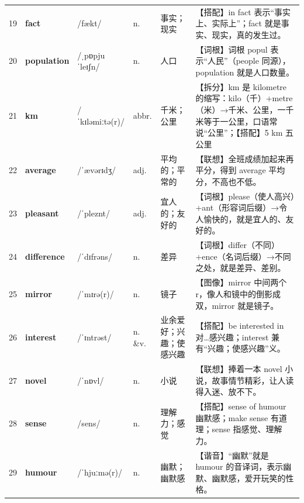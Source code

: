 \documentclass[UTF8,a4paper,11pt,oneside]{ctexbook}
\newcommand{\cellword}[1]{{\bfseries\textcolor{wordcol}{#1}}}
\newcommand{\cellipa}[1]{{\footnotesize\textcolor{ipacol}{#1}}}
\newcommand{\cellpos}[1]{\textcolor{poscol}{#1}}
\newcommand{\cellno}[1]{\textcolor{volcolor!75!black}{#1}}
\begin{document}
{\begin{longtable}{@{}C{0.045\textwidth}L{0.155\textwidth}L{0.175\textwidth}C{0.070\textwidth}L{0.180\textwidth}L{0.282\textwidth}@{}}
 \cellno{19} & \cellword{fact} & \cellipa{/fækt/} & \cellpos{n.} & 事实；现实 & \textcolor{tagColloc}{【搭配】}in fact 表示“事实上、实际上”；fact 就是事实、现实，真的发生过。 \\
\cellno{20} & \cellword{population} & \cellipa{/ˌpɒpjuˈleɪʃn/} & \cellpos{n.} & 人口 & \textcolor{tagRoot}{【词根】}词根 popul 表示“人民”（people 同源），population 就是人口数量。 \\
 \cellno{21} & \cellword{km} & \cellipa{/ˈkɪləmiːtə(r)/} & \cellpos{abbr.} & 千米；公里 & \textcolor{tagSplit}{【拆分】}km 是 kilometre 的缩写：kilo（千）+metre（米）→\allowbreak{}千米、公里，一千米等于一公里，口语常说“公里”；\textcolor{tagColloc}{【搭配】}5 km 五公里 \\
\cellno{22} & \cellword{average} & \cellipa{/ˈævərɪdʒ/} & \cellpos{adj.} & 平均的；平常的 & \textcolor{tagAssoc}{【联想】}全班成绩加起来再平分，得到 average 平均分，不高也不低。 \\
 \cellno{23} & \cellword{pleasant} & \cellipa{/ˈpleznt/} & \cellpos{adj.} & 宜人的；友好的 & \textcolor{tagRoot}{【词根】}please（使人高兴）+ant（形容词后缀）→\allowbreak{}令人愉快的，就是宜人的、友好的。 \\
\cellno{24} & \cellword{difference} & \cellipa{/ˈdɪfrəns/} & \cellpos{n.} & 差异 & \textcolor{tagRoot}{【词根】}differ（不同）+ence（名词后缀）→\allowbreak{}不同之处，就是差异、差别。 \\
 \cellno{25} & \cellword{mirror} & \cellipa{/ˈmɪrə(r)/} & \cellpos{n.} & 镜子 & \textcolor{tagImage}{【图像】}mirror 中间两个 r，像人和镜中的倒影成双，mirror 就是镜子。 \\
\cellno{26} & \cellword{interest} & \cellipa{/ˈɪntrəst/} & \cellpos{n. \&v.} & 业余爱好；兴趣；使感兴趣 & \textcolor{tagColloc}{【搭配】}be interested in 对…感兴趣；interest 兼有“兴趣；使感兴趣”义。 \\
 \cellno{27} & \cellword{novel} & \cellipa{/ˈnɒvl/} & \cellpos{n.} & 小说 & \textcolor{tagAssoc}{【联想】}捧着一本 novel 小说，故事情节精彩，让人读得入迷、放不下。 \\
\cellno{28} & \cellword{sense} & \cellipa{/sens/} & \cellpos{n.} & 理解力；感觉 & \textcolor{tagColloc}{【搭配】}sense of humour 幽默感；make sense 有道理；sense 指感觉、理解力。 \\
 \cellno{29} & \cellword{humour} & \cellipa{/ˈhjuːmə(r)/} & \cellpos{n.} & 幽默；幽默感 & \textcolor{tagSound}{【谐音】}“幽默”就是 humour 的音译词，表示幽默、幽默感，爱开玩笑的性格。 \\

\end{longtable}}
\end{document}
